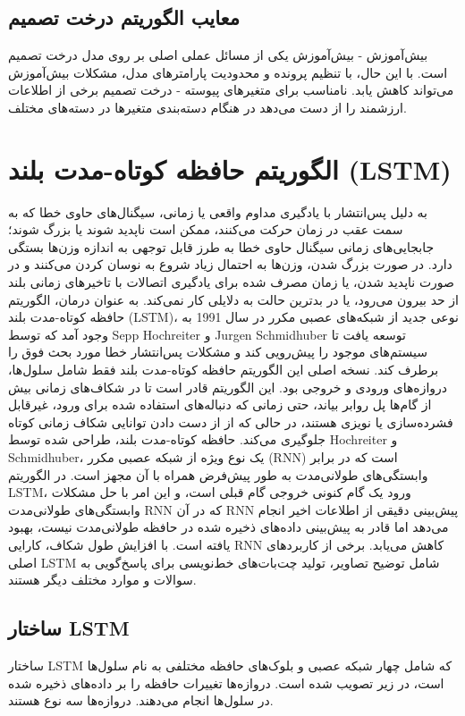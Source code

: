 \documentclass{CSICC2020}
\begin{document}
\subsection{معایب الگوریتم درخت تصمیم}

بیش‌آموزش - بیش‌آموزش یکی از مسائل عملی اصلی بر روی مدل درخت تصمیم است. با این حال، با تنظیم پرونده و محدودیت پارامترهای مدل، مشکلات بیش‌آموزش می‌تواند کاهش یابد. 
 نامناسب برای متغیرهای پیوسته - درخت تصمیم برخی از اطلاعات ارزشمند را از دست می‌دهد در هنگام دسته‌بندی متغیرها در دسته‌های مختلف. 



\section{الگوریتم حافظه کوتاه-مدت بلند (LSTM)}
به دلیل پس‌انتشار با یادگیری مداوم واقعی یا زمانی، سیگنال‌های حاوی خطا که به سمت عقب در زمان حرکت می‌کنند، ممکن است ناپدید شوند یا بزرگ شوند؛ جابجایی‌های زمانی سیگنال حاوی خطا به طرز قابل توجهی به اندازه وزن‌ها بستگی دارد. در صورت بزرگ شدن، وزن‌ها به احتمال زیاد شروع به نوسان کردن می‌کنند و در صورت ناپدید شدن، یا زمان مصرف شده برای یادگیری اتصالات با تاخیر‌های زمانی بلند از حد بیرون می‌رود، یا در بدترین حالت به دلایلی کار نمی‌کند. به عنوان درمان، الگوریتم حافظه کوتاه-مدت بلند (LSTM)، نوعی جدید از شبکه‌های عصبی مکرر در سال 1991 به وجود آمد که توسط Sepp Hochreiter و Jurgen Schmidhuber توسعه یافت تا سیستم‌های موجود را پیش‌رویی کند و مشکلات پس‌انتشار خطا مورد بحث فوق را برطرف کند. نسخه اصلی این الگوریتم حافظه کوتاه-مدت بلند فقط شامل سلول‌ها، دروازه‌های ورودی و خروجی بود. این الگوریتم قادر است تا در شکاف‌های زمانی بیش از گام‌ها پل روابر بیاند، حتی زمانی که دنباله‌های استفاده شده برای ورود، غیرقابل فشرده‌سازی یا نویزی هستند، در حالی که از از دست دادن توانایی شکاف زمانی کوتاه جلوگیری می‌کند. حافظه کوتاه-مدت بلند، طراحی شده توسط Hochreiter و Schmidhuber، یک نوع ویژه از شبکه عصبی مکرر (RNN) است که در برابر وابستگی‌های طولانی‌مدت به طور پیش‌فرض همراه با آن مجهز است. در الگوریتم LSTM، ورود یک گام کنونی خروجی گام قبلی است، و این امر با حل مشکلات وابستگی‌های طولانی‌مدت RNN که در آن RNN پیش‌بینی دقیقی از اطلاعات اخیر انجام می‌دهد اما قادر به پیش‌بینی داده‌های ذخیره شده در حافظه طولانی‌مدت نیست، بهبود یافته است. با افزایش طول شکاف، کارایی RNN کاهش می‌یابد. برخی از کاربردهای اصلی LSTM شامل توضیح تصاویر، تولید چت‌بات‌های خط‌نویسی برای پاسخ‌گویی به سوالات و موارد مختلف دیگر هستند. 
\subsection{ساختار LSTM}
ساختار LSTM که شامل چهار شبکه عصبی و بلوک‌های حافظه مختلفی به نام سلول‌ها است، در زیر تصویب شده است. دروازه‌ها تغییرات حافظه را بر داده‌های ذخیره شده در سلول‌ها انجام می‌دهند. دروازه‌ها سه نوع هستند. 
\end{document}
